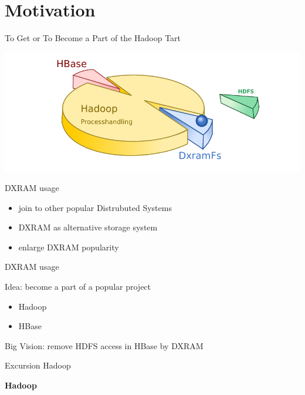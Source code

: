 \hypertarget{motivation}{%
\section{Motivation}\label{motivation}}

\begin{frame}{To Get or To Become a Part of the Hadoop Tart}
\protect\hypertarget{to-get-or-to-become-a-part-of-the-hadoop-tart}{}

\includegraphics{fig/introtart.pdf}

\end{frame}

\begin{frame}{DXRAM usage}
\protect\hypertarget{dxram-usage}{}

\begin{itemize}
\tightlist
\item
  join to other popular Distrubuted Systems
\item
  DXRAM as alternative storage system
\item
  enlarge DXRAM popularity
\end{itemize}

\end{frame}

\begin{frame}{DXRAM usage}
\protect\hypertarget{dxram-usage-1}{}

Idea: become a part of a popular project

\begin{itemize}
\tightlist
\item
  Hadoop
\item
  HBase
\end{itemize}

Big Vision: remove HDFS access in HBase by DXRAM

\end{frame}

\begin{frame}{Excursion Hadoop}
\protect\hypertarget{excursion-hadoop}{}

\textbf{Hadoop}

\end{frame}

